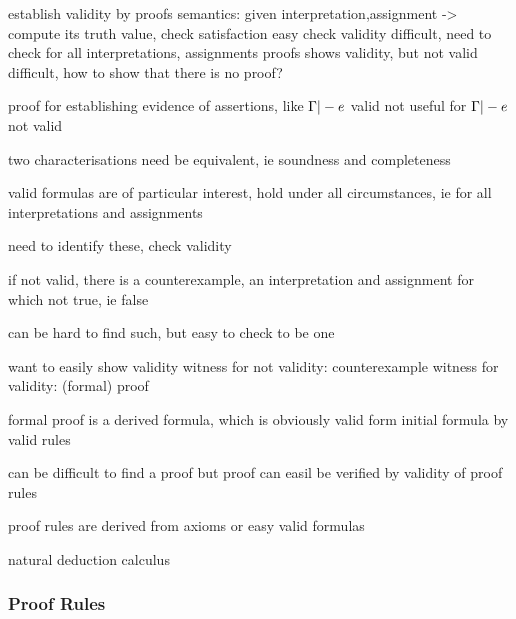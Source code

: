             establish validity by proofs
            semantics: given interpretation,assignment -> compute its truth value, check satisfaction easy
            check validity difficult, need to check for all interpretations, assignments
            proofs shows validity, but not valid difficult, how to show that there is no proof?

            proof for establishing evidence of assertions, like $\Gamma |- e$ valid
            not useful for $\Gamma |- e$ not valid

            two characterisations need be equivalent, ie soundness and completeness

            valid formulas are of particular interest, hold under all circumstances, ie for all interpretations and assignments

            need to identify these, check validity

            if not valid, there is a counterexample, an interpretation and assignment for which not true, ie false

            can be hard to find such, but easy to check to be one

            want to easily show validity
            witness for not validity: counterexample
            witness for validity: (formal) proof

            formal proof is a derived formula, which is obviously valid
            form initial formula by valid rules

            can be difficult to find a proof
            but proof can easil be verified by validity of proof rules

            proof rules are derived from axioms or easy valid formulas

            natural deduction calculus


            \subsubsection{Proof Rules}
                \label{sec:FOL-proof-rules}


